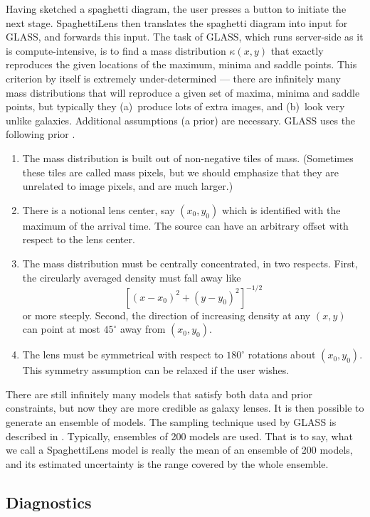 \documentclass[usenatbib]{mn2e}
\newcommand{\spl}{SpaghettiLens\xspace}
\begin{document}
Having sketched a spaghetti diagram, the user presses a button to
initiate the next stage.  \spl then translates the spaghetti diagram
into input for GLASS, and forwards this input.  The task of GLASS,
which runs server-side as it is compute-intensive, is to find a mass
distribution $\kappa(x,y)$ that exactly reproduces the given locations
of the maximum, minima and saddle points. This criterion by itself is
extremely under-determined --- there are infinitely many mass
distributions that will reproduce a given set of maxima, minima and
saddle points, but typically they (a)~produce lots of extra images,
and (b)~look very unlike galaxies.  Additional assumptions (a prior)
are necessary.  GLASS uses the following prior
\citep[cf.][]{1997MNRAS.292..148S,2008ApJ...679...17C}.
\begin{enumerate}
\item The mass distribution is built out of non-negative tiles of
  mass.  (Sometimes these tiles are called mass pixels, but we should
  emphasize that they are unrelated to image pixels, and are much
  larger.)
\item There is a notional lens center, say $(x_0,y_0)$ which is
  identified with the maximum of the arrival time.  The source can
  have an arbitrary offset with respect to the lens center.
\item The mass distribution must be centrally concentrated, in two
  respects.  First, the circularly averaged density must fall away
  like $$ \left[(x-x_0)^2+(y-y_0)^2\right]^{-1/2}$$ or more steeply.
  Second, the direction of increasing density at any $(x,y)$ can point
  at most $45^\circ$ away from $(x_0,y_0)$.
\item The lens must be symmetrical with respect to $180^\circ$ rotations
  about $(x_0,y_0)$.  This symmetry assumption can be relaxed if the
  user wishes.
\end{enumerate}
There are still infinitely many models that satisfy both data and
prior constraints, but now they are more credible as galaxy lenses.
It is then possible to generate an ensemble of models.  The sampling
technique used by GLASS is described in \citep{Lubini2012}.
Typically, ensembles of 200 models are used.  That is to say, what we
call a \spl model is really the mean of an ensemble of 200 models, and
its estimated uncertainty is the range covered by the whole ensemble.



\subsection{Diagnostics} 
\label{sec:diag}
\end{document}
